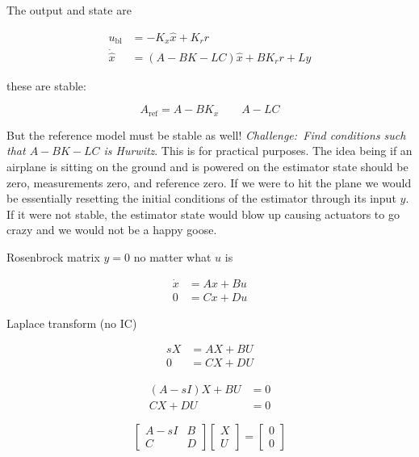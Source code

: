 The output and state are

\begin{equation*}
  \begin{split}
    u_{\text{bl}}&=-K_{x}\hat{x}+K_{r}r \\
    \dot{\hat{x}}&=(A-BK-LC)\hat{x}+BK_{r}r+Ly
  \end{split}
\end{equation*}

these are stable:

\begin{equation*}
  A_{\text{ref}}=A-BK_{x}
  \qquad
  A-LC
\end{equation*}

But the reference model must be stable as well! \textit{Challenge:\ Find conditions such that $A-BK-LC$ is Hurwitz}.
This is for practical purposes.
The idea being if an airplane is sitting on the ground and is powered on the estimator state should be zero, measurements zero, and reference zero.
If we were to hit the plane we would be essentially resetting the initial conditions of the estimator through its input $y$.
If it were not stable, the estimator state would blow up causing actuators to go crazy and we would not be a happy goose.

Rosenbrock matrix $y=0$ no matter what $u$ is

\begin{equation*}
  \begin{split}
    \dot{x}&=Ax+Bu \\
    0&=Cx+Du
  \end{split}
\end{equation*}

Laplace transform (no IC)

\begin{equation*}
  \begin{split}
    sX&=AX+BU \\
    0&=CX+DU
  \end{split}
\end{equation*}

\begin{equation*}
  \begin{split}
    (A-sI)X+BU&=0 \\
    CX+DU&=0
  \end{split}
\end{equation*}

\begin{equation*}
  \begin{bmatrix}
    A-sI & B \\
    C & D
  \end{bmatrix}
  \begin{bmatrix}
    X \\
    U
  \end{bmatrix}=
  \begin{bmatrix}
    0 \\
    0
  \end{bmatrix}
\end{equation*}


